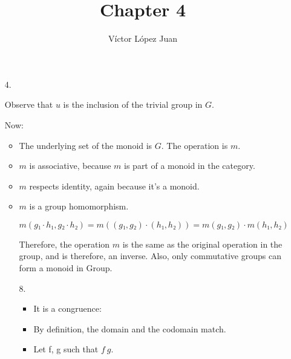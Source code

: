 \documentclass{article}
\author{Víctor López Juan}
\title{Chapter 4}
\begin{document}
\begin{enumerate}
  \item[4.]




    Observe that $u$ is the inclusion of the trivial group in $G$.

    Now:

    \begin{itemize}
      \item The underlying set of the monoid is $G$. The operation is $m$.
      \item $m$ is associative, because $m$ is part of a monoid in the
        category.

      \item $m$ respects identity, again because it's a monoid.

      \item $m$ is a group homomorphism.

        $m(g₁·h₁, g₂·h₂) = m((g₁,g₂)·(h₁,h₂)) = m(g₁,g₂)·m(h₁,h₂)$
                                              

        Therefore, the operation $m$ is the same as the original operation
        in the group, and is therefore, an inverse. Also, only commutative
        groups can form a monoid in Group.
        

  \item[8.]

    \begin{itemize}
      \item It is a congruence:


        \item By definition, the domain and the codomain match.
        \item
          Let f, g such that $f ~ g$.
          


\end{itemize}
\end{itemize}
\end{enumerate}
\end{document}
